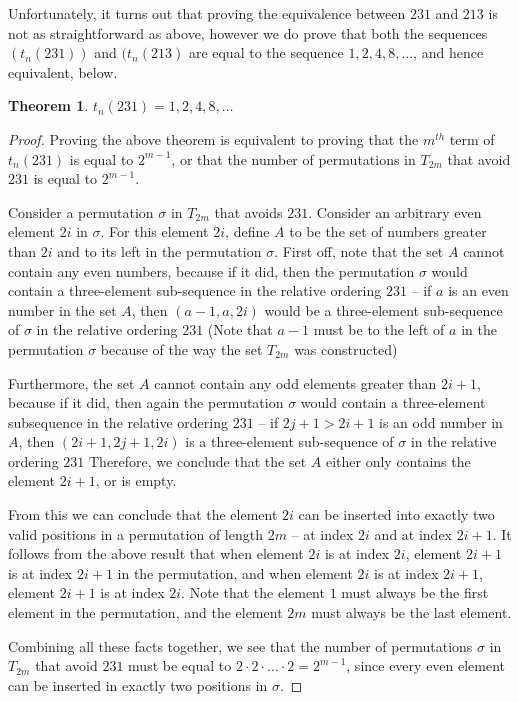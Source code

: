 \documentclass[11pt,letterpaper,twoside,english]{article}
\theoremstyle{theorem}
\newtheorem{theorem}{Theorem}
\theoremstyle{remark}
\begin{document}
Unfortunately, it turns out that proving the equivalence between $231$ and $213$ is not as straightforward as above, however we do prove that both the sequences $(t_n(231))$ and $(t_n(213)$ are equal to the sequence $1, 2, 4, 8, \ldots$, and hence equivalent, below.

\begin{theorem}
$t_n(231) = 1, 2, 4, 8, \ldots$
\end{theorem}

\begin{proof}
Proving the above theorem is equivalent to proving that the $m^{th}$ term of $t_n(231)$ is equal to $2^{m-1}$, or that the number of permutations in $T_{2m}$ that avoid $231$ is equal to $2^{m-1}$.

Consider a permutation $\sigma$ in $T_{2m}$ that avoids $231$. Consider an arbitrary even element $2i$ in $\sigma$. For this element $2i$, define $A$ to be the set of numbers greater than $2i$ and to its left in the permutation $\sigma$. First off, note that the set $A$ cannot contain any even numbers, because if it did, then the permutation $\sigma$ would contain a three-element sub-sequence in the relative ordering $231$ -- if $a$ is an even number in the set $A$, then $(a-1, a, 2i)$ would be a three-element sub-sequence of $\sigma$ in the relative ordering $231$ (Note that $a-1$ must be to the left of $a$ in the permutation $\sigma$ because of the way the set $T_{2m}$ was constructed)

Furthermore, the set $A$ cannot contain any odd elements greater than $2i+1$, because if it did, then again the permutation $\sigma$ would contain a three-element subsequence in the relative ordering $231$ -- if $2j+1 > 2i+1$ is an odd number in $A$, then $(2i+1, 2j+1, 2i)$ is a three-element sub-sequence of $\sigma$ in the relative ordering $231$ Therefore, we conclude that the set $A$ either only contains the element $2i+1$, or is empty.

From this we can conclude that the element $2i$ can be inserted into exactly two valid positions in a permutation of length $2m$ -- at index $2i$ and at index $2i+1$. It follows from the above result that when element $2i$ is at index $2i$, element $2i+1$ is at index $2i+1$ in the permutation, and when element $2i$ is at index $2i+1$, element $2i+1$ is at index $2i$. Note that the element $1$ must always be the first element in the permutation, and the element $2m$ must always be the last element.

Combining all these facts together, we see that the number of permutations $\sigma$ in $T_{2m}$ that avoid $231$ must be equal to $2 \cdot 2 \cdot \ldots \cdot 2 = 2^{m-1}$, since every even element can be inserted in exactly two positions in $\sigma$.

\end{proof}
\end{document}
